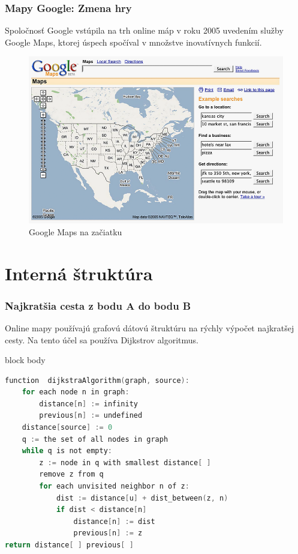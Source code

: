 \documentclass{beamer}
\newenvironment{program}{\begin{beamercolorbox}[rounded=true,shadow=true]{block body}\vspace{-4mm}}{\vspace{-2mm}\end{beamercolorbox}}
\begin{document}
\begin{frame}[fragile=singleslide]\frametitle{Mapy Google: Zmena hry}
Spoločnosť Google vstúpila na trh online máp v roku 2005 uvedením služby Google Maps, ktorej úspech spočíval v množstve inovatívnych funkcií.
\begin{figure}[h]
	\centering
	\includegraphics[scale=0.25]{image2.png}
	\caption{Google Maps na začiatku}
	\label{fig:googlemaps}
\end{figure}
\end{frame}


\section{Interná štruktúra}

\begin{frame}[fragile=singleslide]\frametitle{Najkratšia cesta z bodu A do bodu B}
Online mapy používajú grafovú dátovú štruktúru na rýchly výpočet najkratšej cesty. Na tento účel sa používa Dijkstrov algoritmus.
\begin{program}
\begin{lstlisting}[language=C, caption=Reprezentácia pseudokódu]
function  dijkstraAlgorithm(graph, source):
	for each node n in graph:
		distance[n] := infinity
		previous[n] := undefined
	distance[source] := 0
	q := the set of all nodes in graph
	while q is not empty:
		z := node in q with smallest distance[ ]
		remove z from q
		for each unvisited neighbor n of z:
			dist := distance[u] + dist_between(z, n)
			if dist < distance[n]
				distance[n] := dist
				previous[n] := z
return distance[ ] previous[ ]
	
\end{lstlisting}
\end{program}
\end{frame}
\end{document}
